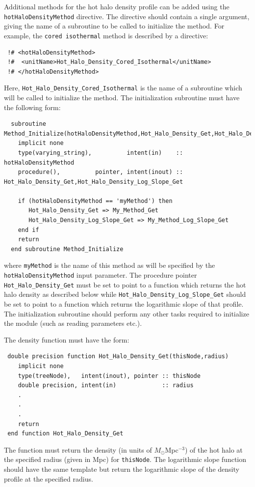 Additional methods for the hot halo density profile can be added using the {\tt hotHaloDensityMethod} directive. The directive should contain a single argument, giving the name of a subroutine to be called to initialize the method. For example, the {\tt cored isothermal} method is described by a directive:
\begin{verbatim}
 !# <hotHaloDensityMethod>
 !#  <unitName>Hot_Halo_Density_Cored_Isothermal</unitName>
 !# </hotHaloDensityMethod>
\end{verbatim}
Here, {\tt Hot\_Halo\_Density\_Cored\_Isothermal} is the name of a subroutine which will be called to initialize the method. The initialization subroutine must have the following form:
\begin{verbatim}
  subroutine Method_Initialize(hotHaloDensityMethod,Hot_Halo_Density_Get,Hot_Halo_Density_Log_Slope_Get)
    implicit none
    type(varying_string),          intent(in)    :: hotHaloDensityMethod
    procedure(),          pointer, intent(inout) :: Hot_Halo_Density_Get,Hot_Halo_Density_Log_Slope_Get
    
    if (hotHaloDensityMethod == 'myMethod') then
       Hot_Halo_Density_Get => My_Method_Get
       Hot_Halo_Density_Log_Slope_Get => My_Method_Log_Slope_Get
    end if
    return
  end subroutine Method_Initialize
\end{verbatim}
where {\tt myMethod} is the name of this method as will be specified by the {\tt hotHaloDensityMethod} input parameter. The procedure pointer {\tt Hot\_Halo\_Density\_Get} must be set to point to a function which returns the hot halo density as described below while {\tt Hot\_Halo\_Density\_Log\_Slope\_Get} should be set to point to a function which returns the logarithmic slope of that profile. The initialization subroutine should perform any other tasks required to initialize the module (such as reading parameters etc.).

The density function must have the form:
\begin{verbatim}
 double precision function Hot_Halo_Density_Get(thisNode,radius)
    implicit none
    type(treeNode),   intent(inout), pointer :: thisNode
    double precision, intent(in)             :: radius
    .
    .
    .
    return
 end function Hot_Halo_Density_Get
\end{verbatim}
The function must return the density (in units of $M_\odot$Mpc$^{-3}$) of the hot halo at the specified radius (given in Mpc) for {\tt thisNode}. The logarithmic slope function should have the same template but return the logarithmic slope of the density profile at the specified radius.

